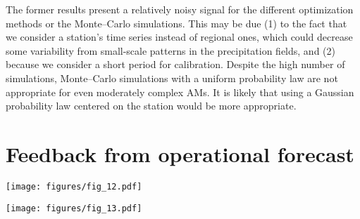 \documentclass[review]{elsarticle}
\begin{document}
The former results present a relatively noisy signal for the different optimization methods or the Monte--Carlo simulations. This may be due (1) to the fact that we consider a station’s time series instead of regional ones, which could decrease some variability from small-scale patterns in the precipitation fields, and (2) because we consider a short period for calibration. Despite the high number of simulations, Monte--Carlo simulations with a uniform probability law are not appropriate for even moderately complex AMs. It is likely that using a Gaussian probability law centered on the station would be more appropriate.


\section{Feedback from operational forecast}
\label{sec:operational}

\begin{figure*}[hbt!]
	\vspace{-70pt}
	\texttt{[image: figures/fig\_12.pdf]}
	\caption{Forecasts for the Binn station (Fig. \ref{figure:variable_exploration}) over the period 2016--2018 obtained using the 4Zo method (Table \ref{table:methods}) with a lead time of three days. The distributions provided by the analog values are summarized by the $90^{th}$, $60^{th}$, and $30^{th}$ percentiles, as well as the maximum (crosses), all of them averaged over the four daily forecasts. Additionally, the four $90^{th}$ percentiles were also plotted to show the consistency / variability between the four daily forecasts. The shaded areas correspond to forecasts downtime.}
	\label{figure:operational_4z}
\end{figure*}

\begin{figure*}[hbt!]
	\vspace{-70pt}
	\texttt{[image: figures/fig\_13.pdf]}
	\caption{Same as Fig. \ref{figure:operational_4z_2mi} but for the 4Zo-2MIo method (Table \ref{table:methods}) with a lead time of one day.}
	\label{figure:operational_4z_2mi}
\end{figure*}
\end{document}
